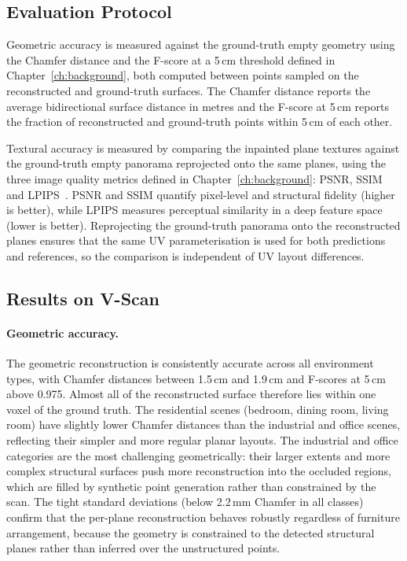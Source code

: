 \subsection{Evaluation Protocol}
\label{sec:6_exp_protocol}

Geometric accuracy is measured against the ground-truth empty geometry using the Chamfer distance and the F-score at a 5\,cm threshold defined in Chapter~\ref{ch:background}, both computed between points sampled on the reconstructed and ground-truth surfaces. The Chamfer distance reports the average bidirectional surface distance in metres and the F-score at 5\,cm reports the fraction of reconstructed and ground-truth points within 5\,cm of each other.

Textural accuracy is measured by comparing the inpainted plane textures against the ground-truth empty panorama reprojected onto the same planes, using the three image quality metrics defined in Chapter~\ref{ch:background}: \gls{PSNR}, \gls{SSIM} and \gls{LPIPS}~\cite{zhang_unreasonable_2018}. PSNR and SSIM quantify pixel-level and structural fidelity (higher is better), while LPIPS measures perceptual similarity in a deep feature space (lower is better). Reprojecting the ground-truth panorama onto the reconstructed planes ensures that the same UV parameterisation is used for both predictions and references, so the comparison is independent of UV layout differences.


\subsection{Results on V-Scan}
\label{sec:6_exp_vscan}

\paragraph{Geometric accuracy.}
The geometric reconstruction is consistently accurate across all environment types, with Chamfer distances between 1.5\,cm and 1.9\,cm and F-scores at 5\,cm above 0.975. Almost all of the reconstructed surface therefore lies within one voxel of the ground truth. The residential scenes (bedroom, dining room, living room) have slightly lower Chamfer distances than the industrial and office scenes, reflecting their simpler and more regular planar layouts. The industrial and office categories are the most challenging geometrically: their larger extents and more complex structural surfaces push more reconstruction into the occluded regions, which are filled by synthetic point generation rather than constrained by the scan. The tight standard deviations (below 2.2\,mm Chamfer in all classes) confirm that the per-plane reconstruction behaves robustly regardless of furniture arrangement, because the geometry is constrained to the detected structural planes rather than inferred over the unstructured points.

